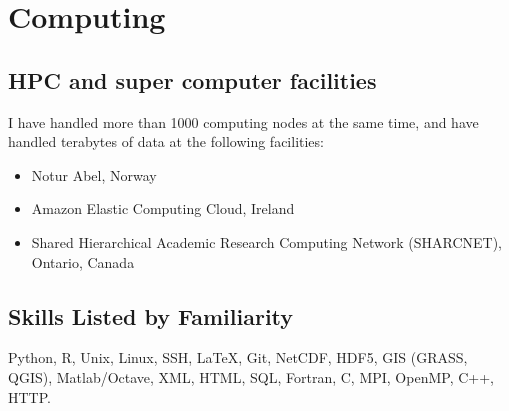 \section*{Computing}
\subsection*{HPC and super computer facilities}
I have handled more than 1000 computing nodes at the same time, and have handled terabytes of data at the following facilities:
\begin{itemize}
  \itemsep-0.1em
\item Notur Abel, Norway
\item Amazon Elastic Computing Cloud, Ireland
\item Shared Hierarchical Academic Research Computing Network (SHARCNET), Ontario, Canada
\end{itemize}

\subsection*{Skills Listed by Familiarity}
Python, R, Unix, Linux, SSH, \LaTeX, Git, NetCDF, HDF5, GIS (GRASS, QGIS),
Matlab/Octave, XML, HTML, SQL, Fortran, C, MPI, OpenMP, C++, HTTP. 
